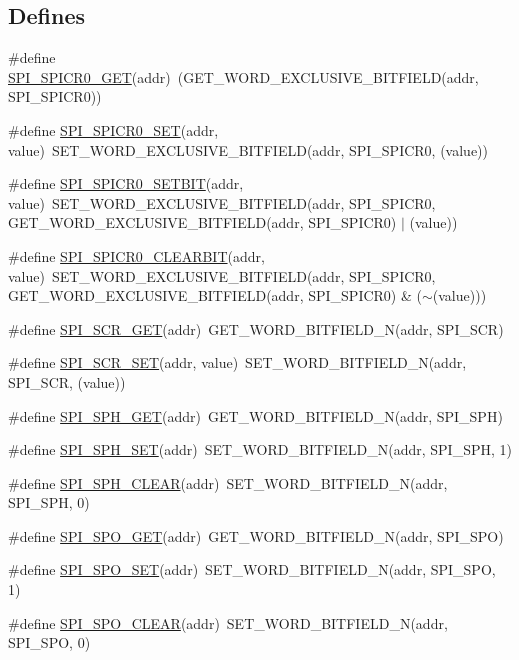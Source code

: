 \subsection*{Defines}
\begin{DoxyCompactItemize}
\item 
\#define \hyperlink{a00572_af82dadc598fe835c42078c20da1765c0}{SPI\_\-SPICR0\_\-GET}(addr)~(GET\_\-WORD\_\-EXCLUSIVE\_\-BITFIELD(addr, SPI\_\-SPICR0))
\item 
\#define \hyperlink{a00572_abbe0ab363523ec21587a04452ea08f0a}{SPI\_\-SPICR0\_\-SET}(addr, value)~SET\_\-WORD\_\-EXCLUSIVE\_\-BITFIELD(addr, SPI\_\-SPICR0, (value))
\item 
\#define \hyperlink{a00572_aa59607a5125db58566c6627701584be5}{SPI\_\-SPICR0\_\-SETBIT}(addr, value)~SET\_\-WORD\_\-EXCLUSIVE\_\-BITFIELD(addr, SPI\_\-SPICR0, GET\_\-WORD\_\-EXCLUSIVE\_\-BITFIELD(addr, SPI\_\-SPICR0) $|$ (value))
\item 
\#define \hyperlink{a00572_abfe594eb6e8b3796bd9fda08a016cc45}{SPI\_\-SPICR0\_\-CLEARBIT}(addr, value)~SET\_\-WORD\_\-EXCLUSIVE\_\-BITFIELD(addr, SPI\_\-SPICR0, GET\_\-WORD\_\-EXCLUSIVE\_\-BITFIELD(addr, SPI\_\-SPICR0) \& ($\sim$(value)))
\item 
\#define \hyperlink{a00572_a66f175ac5717a67b2941def2c2633f88}{SPI\_\-SCR\_\-GET}(addr)~GET\_\-WORD\_\-BITFIELD\_\-N(addr, SPI\_\-SCR)
\item 
\#define \hyperlink{a00572_ad2088a37398a52dda82b4e33b00d3fc8}{SPI\_\-SCR\_\-SET}(addr, value)~SET\_\-WORD\_\-BITFIELD\_\-N(addr, SPI\_\-SCR, (value))
\item 
\#define \hyperlink{a00572_ab614b006d25a4f97b00c084d14fb19ff}{SPI\_\-SPH\_\-GET}(addr)~GET\_\-WORD\_\-BITFIELD\_\-N(addr, SPI\_\-SPH)
\item 
\#define \hyperlink{a00572_a43979c87129bff0158901bff9c2e7319}{SPI\_\-SPH\_\-SET}(addr)~SET\_\-WORD\_\-BITFIELD\_\-N(addr, SPI\_\-SPH, 1)
\item 
\#define \hyperlink{a00572_a96ea96dcec5b17db91f47bb2d8cec46c}{SPI\_\-SPH\_\-CLEAR}(addr)~SET\_\-WORD\_\-BITFIELD\_\-N(addr, SPI\_\-SPH, 0)
\item 
\#define \hyperlink{a00572_a6da368799af6b88905ff6e3b2b4eea52}{SPI\_\-SPO\_\-GET}(addr)~GET\_\-WORD\_\-BITFIELD\_\-N(addr, SPI\_\-SPO)
\item 
\#define \hyperlink{a00572_a54e9c3bb3f5fb7f749a80a34b28fb96a}{SPI\_\-SPO\_\-SET}(addr)~SET\_\-WORD\_\-BITFIELD\_\-N(addr, SPI\_\-SPO, 1)
\item 
\#define \hyperlink{a00572_ace627a283484da239b2a8e1cc25bf4c8}{SPI\_\-SPO\_\-CLEAR}(addr)~SET\_\-WORD\_\-BITFIELD\_\-N(addr, SPI\_\-SPO, 0)

\end{DoxyCompactItemize}
